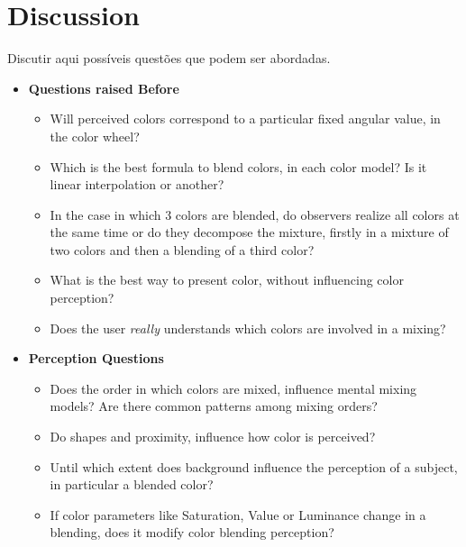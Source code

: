 \section{Discussion}
\label{sec:background_discussion}
%
Discutir aqui possíveis questões que podem ser abordadas. \par
%
\begin{itemize}
	\setlength\itemsep{0.1em}
	\item \textbf{Questions raised Before}
    \begin{itemize}
    	\setlength\itemsep{0.1em}
			\item Will perceived colors correspond to a particular fixed angular value, in the color wheel?
      \item Which is the best formula to blend colors, in each color model? Is it linear interpolation or another?
      \item In the case in which 3 colors are blended, do observers realize all colors at the same time or do they decompose the mixture, firstly in a mixture of two colors and then a blending of a third color?
      \item What is the best way to present color, without influencing color perception?
      \item Does the user \emph{really} understands which colors are involved in a mixing?
		\end{itemize}
  \item \textbf{Perception Questions}
    \begin{itemize}
    	\setlength\itemsep{0.1em}
    	\item Does the order in which colors are mixed, influence mental mixing models? Are there common patterns among mixing orders?
      \item Do shapes and proximity, influence how color is perceived?
      \item Until which extent does background influence the perception of a subject, in particular a blended color?
      \item If color parameters like Saturation, Value or Luminance change in a blending, does it modify color blending perception?
    \end{itemize}
\end{itemize}

